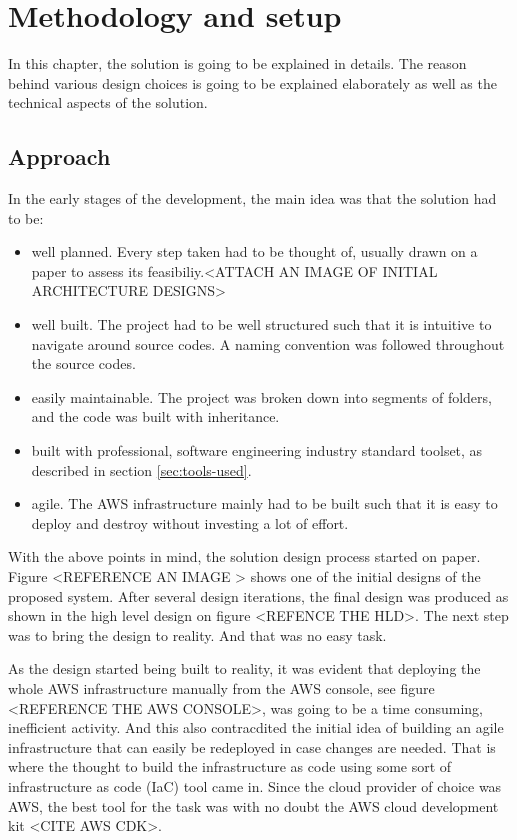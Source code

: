 
\chapter{Methodology and setup}
\label{chap:methodology-and-setup}
In this chapter, the solution is going to be explained in details. The reason behind various design choices is going to be explained elaborately as well as the technical aspects of the solution.

\section{Approach}
In the early stages of the development, the main idea was that the solution had to be:

\begin{itemize}
    \item well planned. Every step taken had to be thought of, usually drawn on a paper to assess its feasibiliy.<ATTACH AN IMAGE OF INITIAL ARCHITECTURE DESIGNS>
    \item well built. The project had to be well structured such that it is intuitive to navigate around source codes. A naming convention was followed throughout the source codes.
    \item easily maintainable. The project was broken down into segments of folders, and the code was built with inheritance.
    \item built with professional, software engineering industry standard toolset, as described in section \ref{sec:tools-used}.
    \item agile. The AWS infrastructure mainly had to be built such that it is easy to deploy and destroy without investing a lot of effort.
\end{itemize}

With the above points in mind, the solution design process started on paper. Figure <REFERENCE AN IMAGE > shows one of the initial designs of the proposed system. After several design iterations, the final design was produced as shown in the high level design on figure <REFENCE THE HLD>. The next step was to bring the design to reality. And that was no easy task.

As the design started being built to reality, it was evident that deploying the whole AWS infrastructure manually from the AWS console, see figure <REFERENCE THE AWS CONSOLE>, was going to be a time consuming, inefficient activity. And this also contracdited the initial idea of building an agile infrastructure that can easily be redeployed in case changes are needed. That is where the thought to build the infrastructure as code using some sort of infrastructure as code (IaC) tool came in. Since the cloud provider of choice was AWS, the best tool for the task was with no doubt the AWS cloud development kit <CITE AWS CDK>.

